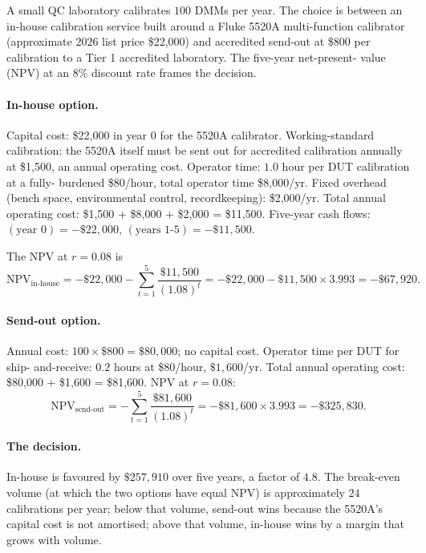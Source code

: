 A small QC laboratory calibrates $100$ DMMs per year.
The choice is between an in-house calibration service built
around a Fluke 5520A multi-function calibrator
\cite{web:ch03t3-fluke-5520a} (approximate $2026$ list price
\$22,000) and accredited send-out at \$800 per calibration
to a Tier 1 accredited laboratory. The five-year net-present-
value (NPV) at an $8\%$ discount rate frames the decision.

\paragraph{In-house option.} Capital cost: \$22,000 in
year $0$ for the 5520A calibrator. Working-standard
calibration: the 5520A itself must be sent out for accredited
calibration annually at \$1,500, an annual operating cost.
Operator time: $1.0$ hour per DUT calibration at a fully-
burdened \$80/hour, total operator time \$8,000/yr. Fixed
overhead (bench space, environmental control,
recordkeeping): \$2,000/yr. Total annual operating cost:
\$1,500 + \$8,000 + \$2,000 = \$11,500. Five-year cash
flows: $(\text{year } 0) = -\$22{,}000$,
$(\text{years } 1\text{-}5) = -\$11{,}500$.

The NPV at $r = 0.08$ is
\[
\text{NPV}_{\text{in-house}} = -\$22{,}000 -
\sum_{t = 1}^{5} \frac{\$11{,}500}{(1.08)^{t}} =
-\$22{,}000 - \$11{,}500 \times 3.993 = -\$67{,}920.
\]

\paragraph{Send-out option.} Annual cost: $100 \times \$800 =
\$80{,}000$; no capital cost. Operator time per DUT for ship-
and-receive: $0.2$ hours at \$80/hour, $\$1{,}600$/yr.
Total annual operating cost: \$80,000 + \$1,600 = \$81,600.
NPV at $r = 0.08$:
\[
\text{NPV}_{\text{send-out}} = -\sum_{t = 1}^{5}
\frac{\$81{,}600}{(1.08)^{t}} = -\$81{,}600 \times 3.993 =
-\$325{,}830.
\]

\paragraph{The decision.} In-house is favoured by $\$257{,}910$
over five years, a factor of $4.8$. The break-even volume
(at which the two options have equal NPV) is approximately
$24$ calibrations per year; below that volume, send-out wins
because the 5520A's capital cost is not amortised; above that
volume, in-house wins by a margin that grows with volume.

